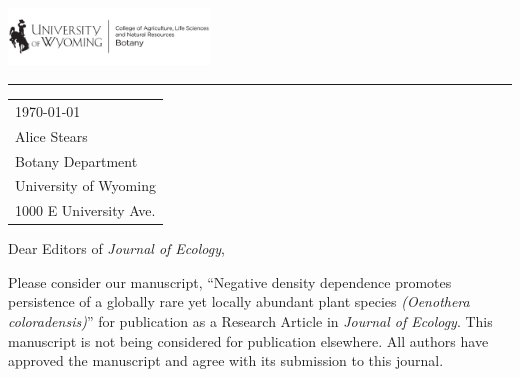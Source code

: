 \documentclass{article}
\begin{document}

\includegraphics[width=0.4\textwidth]{UWtwoline_H_Botany_black.png} %

\vspace{-1em} %

\rule{\linewidth}{1pt} %

\bigskip\bigskip %


\hfill
\begin{tabular}{l @{}}
	\today \\ %
	Alice Stears\\
        Botany Department\\
	  University of Wyoming\\ %
	1000 E University Ave. \\
\end{tabular}

\bigskip %



Dear Editors of \textit{Journal of Ecology},

\bigskip %

Please consider our manuscript, “Negative density dependence promotes persistence of a globally rare yet locally abundant plant species \textit{(Oenothera coloradensis)}” for publication as a Research Article in \textit{Journal of Ecology}. This manuscript is not being considered for publication elsewhere. All authors have approved the manuscript and agree with its submission to this journal.
\end{document}
